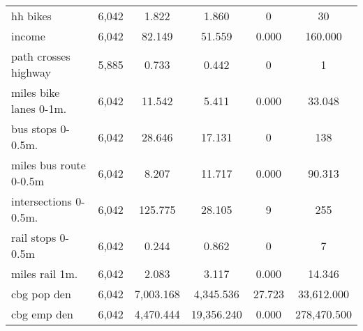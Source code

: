 \begin{table}[!htbp]
\begin{tabular}{@{\extracolsep{5pt}}lccccc}
hh bikes & 6,042 & 1.822 & 1.860 & 0 & 30 \\ 
 
income & 6,042 & 82.149 & 51.559 & 0.000 & 160.000 \\ 




path crosses highway& 5,885 & 0.733 & 0.442 & 0 & 1 \\ 

 
miles bike lanes 0-1m. & 6,042 & 11.542 & 5.411 & 0.000 & 33.048 \\ 
 
bus stops 0-0.5m. & 6,042 & 28.646 & 17.131 & 0 & 138 \\ 

 
miles bus route 0-0.5m & 6,042 & 8.207 & 11.717 & 0.000 & 90.313 \\ 


intersections 0-0.5m. & 6,042 & 125.775 & 28.105 & 9 & 255 \\ 
 
 
rail stops 0-0.5m & 6,042 & 0.244 & 0.862 & 0 & 7 \\ 
 
 
miles rail 1m. & 6,042 & 2.083 & 3.117 & 0.000 & 14.346 \\ 
 


 
cbg pop den & 6,042 & 7,003.168 & 4,345.536 & 27.723 & 33,612.000 \\ 

cbg emp den & 6,042 & 4,470.444 & 19,356.240 & 0.000 & 278,470.500 \\ 



\end{tabular}
\end{table}
